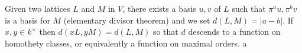 \documentclass{article}
\begin{document}
Given two lattices $L$ and $M$ in $V$, there exists a basis $u,v$ of $L$ such that $\pi^a u , \pi^b v$ is a basis for $M$ (elementary divisor theorem) and we set $d(L,M) = |a-b|$. If $x,y\in k^\times$ then $d(xL,yM)=d(L,M)$ so that $d$ descends to a function on homothety classes, or equivalently a function on maximal orders. a
\end{document}
